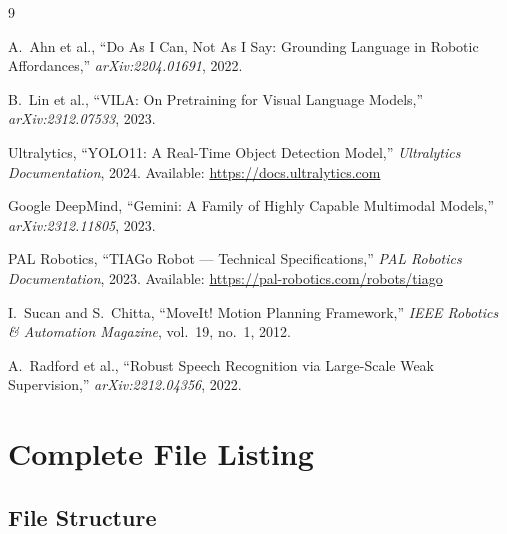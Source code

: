 \documentclass[12pt,a4paper]{report}
\begin{document}
\begin{thebibliography}{9}

  A.~Ahn et al.,
  ``Do As I Can, Not As I Say: Grounding Language in Robotic Affordances,''
  \textit{arXiv:2204.01691}, 2022.

  B.~Lin et al.,
  ``VILA: On Pretraining for Visual Language Models,''
  \textit{arXiv:2312.07533}, 2023.

  Ultralytics,
  ``YOLO11: A Real-Time Object Detection Model,''
  \textit{Ultralytics Documentation}, 2024.
  Available: \url{https://docs.ultralytics.com}

  Google DeepMind,
  ``Gemini: A Family of Highly Capable Multimodal Models,''
  \textit{arXiv:2312.11805}, 2023.

  PAL Robotics,
  ``TIAGo Robot — Technical Specifications,''
  \textit{PAL Robotics Documentation}, 2023.
  Available: \url{https://pal-robotics.com/robots/tiago}

  I.~Sucan and S.~Chitta,
  ``MoveIt! Motion Planning Framework,''
  \textit{IEEE Robotics \& Automation Magazine}, vol.~19, no.~1, 2012.

  A.~Radford et al.,
  ``Robust Speech Recognition via Large-Scale Weak Supervision,''
  \textit{arXiv:2212.04356}, 2022.

\end{thebibliography}

\appendix
\chapter{Complete File Listing}

\section{File Structure}
\end{document}
